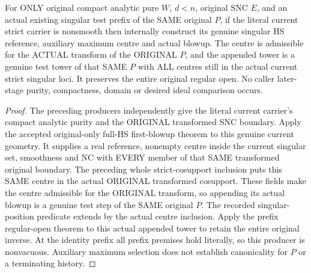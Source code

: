 \begin{theorem}
\label{hir:actual-hs-singular-same-original-prefix-extension}
\leanok
For ONLY original compact analytic pure $W$, $d<n$, original SNC $E$, and an
actual existing singular test prefix of the SAME original $P$, if the literal
current strict carrier is nonsmooth then internally construct its genuine
singular HS reference, auxiliary maximum centre and actual blowup. The centre
is admissible for the ACTUAL transform of the ORIGINAL $P$, and the appended
tower is a genuine test tower of that SAME $P$ with ALL centres still in the
actual current strict singular loci. It preserves the entire original regular
open. No caller later-stage purity, compactness, domain or desired ideal
comparison occurs.
\end{theorem}
\begin{proof}
The preceding producers independently give the literal current carrier's
compact analytic purity and the ORIGINAL transformed SNC boundary. Apply
the accepted original-only full-HS first-blowup theorem to this genuine
current geometry. It supplies a real reference, nonempty centre inside the
current singular set, smoothness and NC with EVERY member of that SAME
transformed original boundary. The preceding whole strict-cosupport inclusion
puts this SAME centre in the actual ORIGINAL transformed cosupport. These
fields make the centre admissible for the ORIGINAL transform, so appending
its actual blowup is a genuine test step of the SAME original $P$. The
recorded singular-position predicate extends by the actual centre inclusion.
Apply the prefix regular-open theorem to this actual appended tower to
retain the entire original inverse. At the identity prefix all prefix
premises hold literally, so this producer is nonvacuous. Auxiliary maximum
selection does not establish canonicality for $P$ or a terminating history.
\end{proof}
